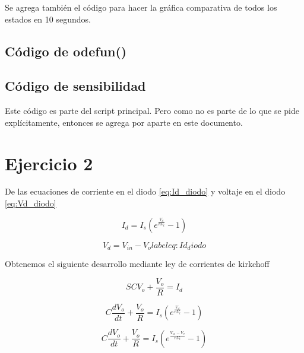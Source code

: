 \documentclass[12pt,letterpaper]{article}
\begin{document}
 Se agrega también el código para hacer la gráfica comparativa de todos los estados en 10 segundos.
  
 
\subsection{Código de odefun()}
 
\subsection{Código de sensibilidad}
 Este código es parte del script principal. Pero como no es parte de lo que se pide explícitamente, entonces se agrega por aparte en este documento.
  
 
  



\section{Ejercicio 2}

De las ecuaciones de corriente en el diodo \eqref{eq:Id_diodo} y voltaje en el diodo  \eqref{eq:Vd_diodo}

\begin{equation}
\label{eq:Id_diodo}
I_d=I_s(e^{\frac{V_d}{nV_t}}-1)
\end{equation}



\begin{equation}\label{eq:Vd_diodo}
V_d= V_{in}-V_o
label{eq:Id_diodo}
\end{equation}

Obtenemos el siguiente desarrollo mediante ley de corrientes de kirkchoff 

\begin{equation}
SCV_o + \frac{V_o}{R} = I_d
\end{equation}

\begin{equation}
C \frac{dV_o}{dt} + \frac{V_o}{R} = I_s\left(e^{\frac{V_d}{nV_t}}-1\right)
\end{equation}

\begin{equation}
C \frac{dV_o}{dt} + \frac{V_o}{R} = I_s\left(e^{\frac{V_{in}-V_{o}}{nV_t}}-1\right)
\end{equation}
\end{document}
